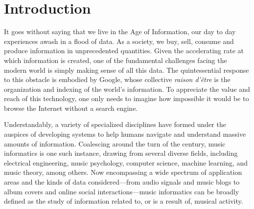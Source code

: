 

\graphicspath{{1/figures/}}

\chapter{Introduction}
\label{chp:introduction}

It goes without saying that we live in the Age of Information, our day to day experiences awash in a flood of data.
As a society, we buy, sell, consume and produce information in unprecedented quantities.
Given the accelerating rate at which information is created, one of the fundamental challenges facing the modern world is simply making sense of all this data.
The quintessential response to this obstacle is embodied by Google, whose collective \emph{raison d'\^etre} is the organization and indexing of the world's information.
To appreciate the value and reach of this technology, one only needs to imagine how impossible it would be to browse the Internet without a search engine.




Understandably, a variety of specialized disciplines have formed under the auspices of developing systems to help humans navigate and understand massive amounts of information.
Coalescing around the turn of the century, music informatics is one such instance, drawing from several diverse fields, including electrical engineering, music psychology, computer science, machine learning, and music theory, among others.
Now encompassing a wide spectrum of application areas and the kinds of data considered---from audio signals and music blogs to album covers and online social interactions---music informatics can be broadly defined as the study of information related to, or is a result of, musical activity.

